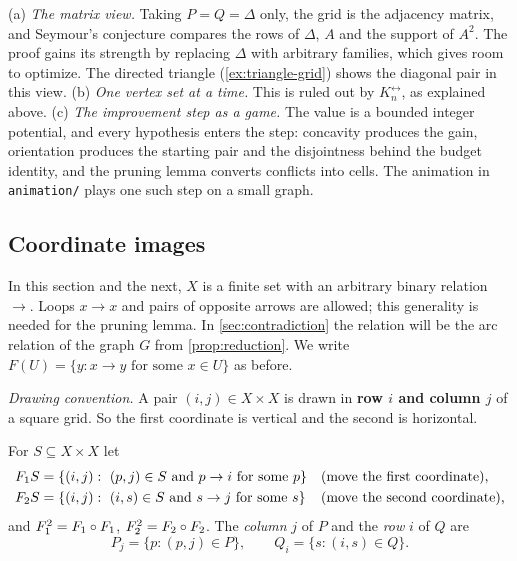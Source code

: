 \begin{remark}\label{rem:other-views}
(a) \emph{The matrix view.} Taking $P=Q=\Delta$ only, the grid is the
adjacency matrix, and Seymour's conjecture compares the rows of $\Delta$,
$A$ and the support of $A^2$. The proof gains its strength by replacing
$\Delta$ with arbitrary families, which gives room to optimize. The
directed triangle (\cref{ex:triangle-grid}) shows the diagonal pair in this
view.
(b) \emph{One vertex set at a time.} This is ruled out by
$K_n^{\leftrightarrow}$, as explained above.
(c) \emph{The improvement step as a game.} The value is a bounded integer
potential, and every hypothesis enters the step: concavity produces the gain,
orientation produces the starting pair and the disjointness behind the
budget identity, and the pruning lemma converts conflicts into cells. The
animation in \texttt{animation/} plays one such step on a small graph.
\end{remark}

\subsection{Coordinate images}

In this section and the next, $X$ is a finite set with an arbitrary binary
relation $\to$. Loops $x\to x$ and pairs of opposite arrows are
allowed; this generality is needed for the pruning lemma. In
\cref{sec:contradiction} the relation will be the arc relation of the graph
$G$ from \cref{prop:reduction}. We write $F(U)=\{y: x\to y\text{ for some }x\in U\}$
as before.

\emph{Drawing convention.} A pair $(i,j)\in X\times X$ is drawn in
\textbf{row $i$ and column $j$} of a square grid. So the first coordinate is
vertical and the second is horizontal.

\begin{definition}\label{def:coord-images}
For $S\subseteq X\times X$ let
\begin{align*}
 F_1 S&=\{(i,j):\ (p,j)\in S\text{ and }p\to i\text{ for some }p\}
 &&\text{(move the first coordinate),}\\
 F_2 S&=\{(i,j):\ (i,s)\in S\text{ and }s\to j\text{ for some }s\}
 &&\text{(move the second coordinate),}
\end{align*}
and $F_1^2=F_1\circ F_1$, $F_2^2=F_2\circ F_2$. The \emph{column} $j$ of $P$ and the
\emph{row} $i$ of $Q$ are
\[
 P_j=\{p:(p,j)\in P\},\qquad Q_i=\{s:(i,s)\in Q\}.
\]
\end{definition}

